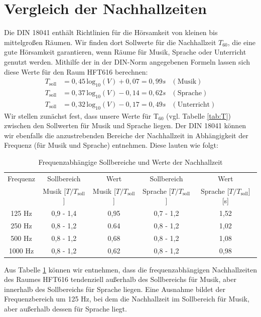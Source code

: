 \section{Vergleich der Nachhallzeiten}
\label{sec:ts}
Die DIN 18041 \cite{DIN_18041} enthält Richtlinien für die Hörsamkeit von kleinen bis mittelgroßen Räumen. 
Wir finden dort Sollwerte für die Nachhallzeit $T_{60}$, die eine gute Hörsamkeit garantieren, wenn Räume für Musik, Sprache oder Unterricht genutzt werden.
Mithilfe der in der DIN-Norm angegebenen Formeln lassen sich diese Werte für den Raum HFT616 berechnen:
\begin{align*}
T_{\mathrm{soll}} &= 0,45\, \mathrm{log}_{10} (V)+0,07 = 0,99 s & \mathrm{(Musik)}\\
T_{\mathrm{soll}} &= 0,37\, \mathrm{log}_{10} (V)-0,14 = 0,62 s & \mathrm{(Sprache)} \\
T_{\mathrm{soll}} &= 0,32\, \mathrm{log}_{10} (V)-0,17 = 0,49 s& \mathrm{(Unterricht)}
\end{align*}
Wir stellen zunächst fest, dass unsere Werte für T$_{60}$ (vgl. Tabelle \ref{tab:T}) zwischen den Sollwerten für Musik und Sprache liegen. 
Der DIN 18041 können wir ebenfalls die anzustrebenden Bereiche der Nachhallzeit in Abhängigkeit der Frequenz (für Musik und Sprache) entnehmen. Diese lauten wie folgt:
\begin{table}[H]
    \centering
    \caption{Frequenzabhängige Sollbereiche und Werte der Nachhallzeit}
    \label{tab:Tsoll}
    \begin{tabular}[\textwidth]{|c|c|c|c|c|}
    \hline
        Frequenz & Sollbereich& Wert&Sollbereich &Wert\\
        & Musik [$T/T_{\mathrm{soll}}$] & Musik [$T/T_{\mathrm{soll}}$] & Sprache [$T/T_{\mathrm{soll}}$]  & Sprache [$T/T_{\mathrm{soll}}$] [s] \\
        \hline
        125 Hz &0,9 - 1,4 & 0,95 &0,7 - 1,2  & 1,52  \\
        250 Hz &0,8 - 1,2 & 0.64 &0,8 - 1,2 & 1,02 \\
        500 Hz &0,8 - 1,2 &0,68 &0,8 - 1,2 &1,08 \\
        1000 Hz & 0,8 - 1,2 & 0,62& 0,8 - 1,2& 0,98 \\
        \hline
    \end{tabular}
\end{table}
Aus Tabelle \ref{tab:Tsoll} können wir entnehmen, dass die frequenzabhängigen Nachhallzeiten des Raumes HFT616 tendenziell außerhalb des Sollbereichs für Musik, aber innerhalb des Sollbereichs für Sprache liegen. Eine Ausnahme bildet der Frequenzbereich um 125 Hz, bei dem die Nachhallzeit im Sollbereich für Musik, aber außerhalb dessen für Sprache liegt. 

